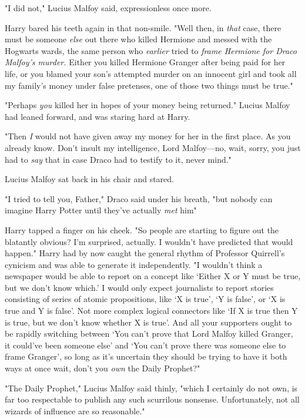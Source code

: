 "I did not," Lucius Malfoy said, expressionless once more.

Harry bared his teeth again in that non-smile. "Well then, in \emph{that} case,
there must be someone \emph{else} out there who killed Hermione and messed with
the Hogwarts wards, the same person who \emph{earlier} tried to \emph{frame
Hermione for Draco Malfoy's murder.} Either you killed Hermione Granger after
being paid for her life, or you blamed your son's attempted murder on an
innocent girl and took all my family's money under false pretenses, one of
those two things must be true."

"Perhaps \emph{you} killed her in hopes of your money being returned." Lucius
Malfoy had leaned forward, and was staring hard at Harry.

"Then \emph{I} would not have given away my money for her in the first place.
As you already know. Don't insult my intelligence, Lord Malfoy—no, wait,
sorry, you just had to \emph{say} that in case Draco had to testify to it,
never mind."

Lucius Malfoy sat back in his chair and stared.

"I tried to tell you, Father," Draco said under his breath, "but nobody can
imagine Harry Potter until they've actually \emph{met} him{\el}"

Harry tapped a finger on his cheek. "So people are starting to figure out the
blatantly obvious? I'm surprised, actually. I wouldn't have predicted that
would happen." Harry had by now caught the general rhythm of Professor
Quirrell's cynicism and was able to generate it independently. "I wouldn't
think a newspaper would be able to report on a concept like `Either X or Y must
be true, but we don't know which.' I would only expect journalists to report
stories consisting of series of atomic propositions, like `X is true', `Y is
false', or `X is true and Y is false'. Not more complex logical connectors like
`If X is true then Y is true, but we don't know whether X is true'. And all
your supporters ought to be rapidly switching between `You can't prove that
Lord Malfoy killed Granger, it could've been someone else' and `You can't prove
there was someone else to frame Granger', so long as it's uncertain they should
be trying to have it both ways at once{\el} wait, don't you \emph{own} the
Daily Prophet?"

"The Daily Prophet," Lucius Malfoy said thinly, "which I certainly do not own,
is far too respectable to publish any such scurrilous nonsense. Unfortunately,
not all wizards of influence are so reasonable."

